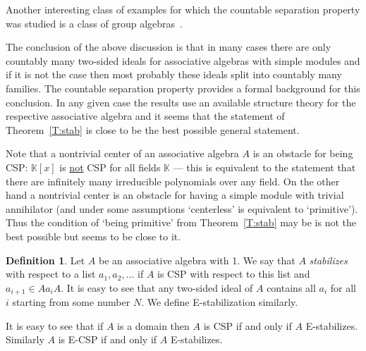 \documentclass{amsart} \textwidth=18.0cm \oddsidemargin=-1cm \evensidemargin=-1cm \topmargin=-1cm \textheight=23cm
\theoremstyle{definition}
\newtheorem{remark}{Remark}
\newtheorem{definition}{Definition}
\begin{document}
Another interesting class of examples for which the countable separation property was studied is a class of group algebras~\cite{K, Z, FL, F, L}.

The conclusion of the above discussion is that in many cases there are only countably many two-sided ideals for associative algebras with simple modules and if it is not the case then most probably these ideals split into countably many families. 
The countable separation property provides a formal background for this conclusion. 
In any given case the results use an available structure theory for the respective associative algebra and it seems that the statement of Theorem~\ref{T:stab} is close to be the best possible general statement.

Note that a nontrivial center of an associative algebra $A$ is an obstacle for being CSP: $\mathbb K[x]$ is \underline{not} CSP for all fields $\mathbb K$ --- this is equivalent to the statement that there are infinitely many irreducible polynomials over any field. 
On the other hand a nontrivial center is an obstacle for having a simple module with trivial annihilator (and under some assumptions `centerless' is equivalent to `primitive'). Thus the condition of `being primitive' from Theorem~\ref{T:stab} may be is not the best possible but seems to be close to it.  


\begin{definition} Let $A$ be an associative algebra with 1. We say that $A$ {\it stabilizes} with respect to a list  $a_1, a_2, \ldots$ if $A$ is CSP with respect to this list and $a_{i+1}\in Aa_iA$. 
It is easy to see that any two-sided ideal of $A$ contains all $a_i$ for all $i$ starting from some number $N$. 
We define E-stabilization similarly. 
\end{definition}
It is easy to see that if $A$ is a domain then $A$ is CSP if and only if $A$ E-stabilizes. 
Similarly $A$ is E-CSP if and only if $A$ E-stabilizes.
\end{document}
